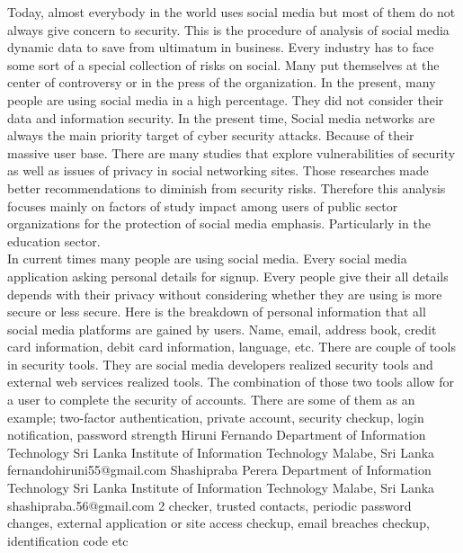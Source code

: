 \hspace*{0.3in}Today, almost everybody in the world uses social media
but most of them do not always give concern to security. This
is the procedure of analysis of social media dynamic data to
save from ultimatum in business. Every industry has to face
some sort of a special collection of risks on social. Many put
themselves at the center of controversy or in the press of the
organization. In the present, many people are using social
media in a high percentage. They did not consider their data
and information security. In the present time, Social media
networks are always the main priority target of cyber security
attacks. Because of their massive user base. There are many
studies that explore vulnerabilities of security as well as issues
of privacy in social networking sites. Those researches made
better recommendations to diminish from security risks.
Therefore this analysis focuses mainly on factors of study
impact among users of public sector organizations for the
protection of social media emphasis. Particularly in the
education sector.\\
\hspace*{0.3in}In current times many people are using social media.
Every social media application asking personal details for
signup. Every people give their all details depends with their
privacy without considering whether they are using is more
secure or less secure. Here is the breakdown of personal
information that all social media platforms are gained by
users. Name, email, address book, credit card information,
debit card information, language, etc. There are couple of
tools in security tools. They are social media developers
realized security tools and external web services realized
tools. The combination of those two tools allow for a user to
complete the security of accounts. There are some of them as
an example; two-factor authentication, private account,
security checkup, login notification, password strength
Hiruni Fernando
Department of Information Technology
Sri Lanka Institute of Information Technology
Malabe, Sri Lanka
fernandohiruni55@gmail.com
Shashipraba Perera
Department of Information Technology
Sri Lanka Institute of Information Technology
Malabe, Sri Lanka
shashipraba.56@gmail.com
2
checker, trusted contacts, periodic password changes, external
application or site access checkup, email breaches checkup,
identification code etc\\
